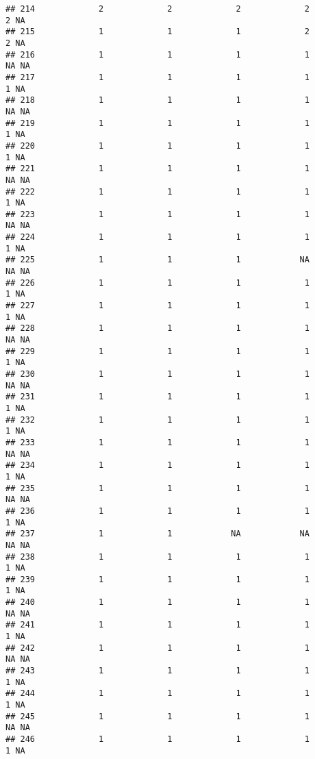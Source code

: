\documentclass[
]{article}
\begin{document}
\begin{verbatim}
## 214             2             2             2             2             2 NA
## 215             1             1             1             2             2 NA
## 216             1             1             1             1            NA NA
## 217             1             1             1             1             1 NA
## 218             1             1             1             1            NA NA
## 219             1             1             1             1             1 NA
## 220             1             1             1             1             1 NA
## 221             1             1             1             1            NA NA
## 222             1             1             1             1             1 NA
## 223             1             1             1             1            NA NA
## 224             1             1             1             1             1 NA
## 225             1             1             1            NA            NA NA
## 226             1             1             1             1             1 NA
## 227             1             1             1             1             1 NA
## 228             1             1             1             1            NA NA
## 229             1             1             1             1             1 NA
## 230             1             1             1             1            NA NA
## 231             1             1             1             1             1 NA
## 232             1             1             1             1             1 NA
## 233             1             1             1             1            NA NA
## 234             1             1             1             1             1 NA
## 235             1             1             1             1            NA NA
## 236             1             1             1             1             1 NA
## 237             1             1            NA            NA            NA NA
## 238             1             1             1             1             1 NA
## 239             1             1             1             1             1 NA
## 240             1             1             1             1            NA NA
## 241             1             1             1             1             1 NA
## 242             1             1             1             1            NA NA
## 243             1             1             1             1             1 NA
## 244             1             1             1             1             1 NA
## 245             1             1             1             1            NA NA
## 246             1             1             1             1             1 NA

\end{verbatim}
\end{document}
